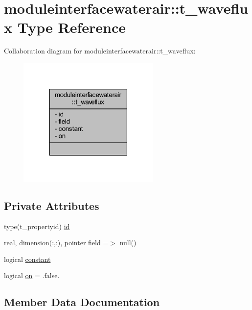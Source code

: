 \hypertarget{structmoduleinterfacewaterair_1_1t__waveflux}{}\section{moduleinterfacewaterair\+:\+:t\+\_\+waveflux Type Reference}
\label{structmoduleinterfacewaterair_1_1t__waveflux}


Collaboration diagram for moduleinterfacewaterair\+:\+:t\+\_\+waveflux\+:\nopagebreak
\begin{figure}[H]
\begin{center}
\leavevmode
\includegraphics[width=199pt]{structmoduleinterfacewaterair_1_1t__waveflux__coll__graph}
\end{center}
\end{figure}
\subsection*{Private Attributes}
\begin{DoxyCompactItemize}
\item 
type(t\+\_\+propertyid) \mbox{\hyperlink{structmoduleinterfacewaterair_1_1t__waveflux_ac551474b55efa12b515d845d0e3d8fc9}{id}}
\item 
real, dimension(\+:,\+:), pointer \mbox{\hyperlink{structmoduleinterfacewaterair_1_1t__waveflux_a479f7b9f910fb89e0b6ad2f5a733647b}{field}} =$>$ null()
\item 
logical \mbox{\hyperlink{structmoduleinterfacewaterair_1_1t__waveflux_af0988ac4a9836c3d9d47fb9110cbde9b}{constant}}
\item 
logical \mbox{\hyperlink{structmoduleinterfacewaterair_1_1t__waveflux_ac19ae0484a409f886e81c6b5ebaf1a14}{on}} = .false.
\end{DoxyCompactItemize}


\subsection{Member Data Documentation}
\mbox{\label{structmoduleinterfacewaterair_1_1t__waveflux_af0988ac4a9836c3d9d47fb9110cbde9b}} 

